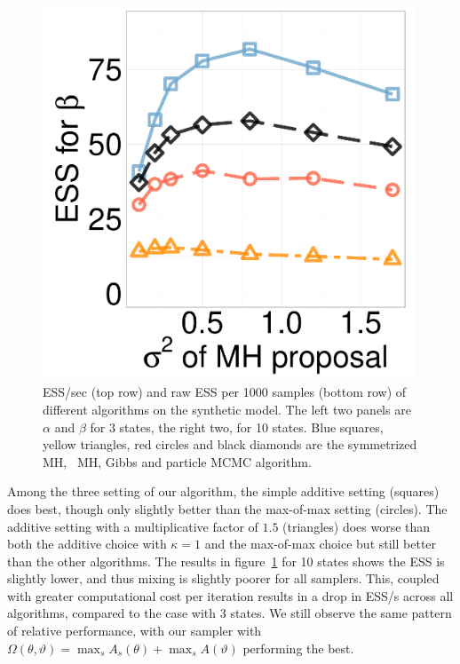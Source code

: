 \begin{figure}[H]
\begin{minipage}[hp]{0.24\linewidth}
	\end{minipage}
  \begin{minipage}[hp]{0.24\linewidth}
  \centering
    \includegraphics [width=0.99\textwidth, angle=0]{figs/ess/EXP_D10beta_k2.pdf}
	\end{minipage}
  \caption{ESS/sec (top row) and raw ESS per 1000 samples (bottom row) of different algorithms on the synthetic  model. The left two panels are $\alpha$ and $\beta$ for 3 states, the right two, for 10 states. Blue squares, yellow triangles, red circles and black diamonds are the symmetrized MH, \naive\ MH, Gibbs and particle MCMC algorithm.} 
     \label{fig:ESS_EXP_D10}
  \end{figure}

Among the three setting of our algorithm, the simple additive setting
 ({squares}) does best, though only slightly better than the {max-of-max} setting (circles). 
The {additive setting with a multiplicative factor of $1.5$} ({triangles}) does worse than both the {additive choice with $\kappa=1$ and the max-of-max choice} but still better than the other algorithms. 
The results in figure~\ref{fig:ESS_EXP_D10} for 10 states shows the ESS is slightly lower, and thus mixing is slightly poorer for all samplers. This, coupled with greater computational cost per iteration results in a drop in ESS/s across all algorithms, compared to the case with 3 states. We still observe the same pattern of relative performance, with our sampler with $\Omega(\theta,\vartheta) = \max_s A_s(\theta) + \max_s A(\vartheta)$ performing the best. 

